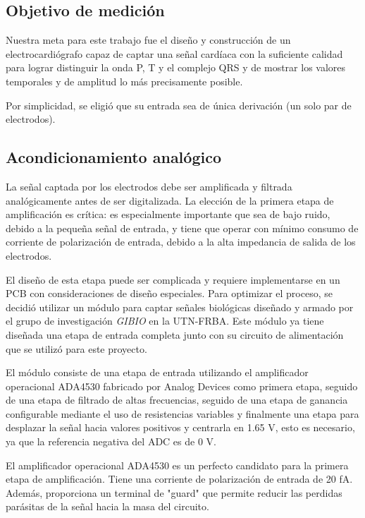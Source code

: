 \documentclass[conference]{IEEEtran}
\begin{document}
\subsection{Objetivo de medición}

Nuestra meta para este trabajo fue el diseño y construcción de un
electrocardiógrafo capaz de captar una señal cardíaca con la suficiente calidad
para lograr distinguir la onda P, T y el complejo QRS y de mostrar los valores
temporales y de amplitud lo más precisamente posible.

Por simplicidad, se eligió que su entrada sea de única derivación (un solo par
de electrodos).

\subsection{Acondicionamiento analógico}


La señal captada por los electrodos debe ser amplificada y filtrada
analógicamente antes de ser digitalizada. La elección de la primera etapa de
amplificación es crítica: es especialmente importante que sea de bajo ruido,
debido a la pequeña señal de entrada, y tiene que operar con mínimo consumo de
corriente de polarización de entrada, debido a la alta impedancia de salida de
los electrodos.

El diseño de esta etapa puede ser complicada y requiere implementarse en un PCB 
con consideraciones de diseño especiales. Para optimizar el proceso, se decidió
utilizar un módulo para captar señales biológicas diseñado y armado por el grupo
de investigación \textit{GIBIO} en la UTN-FRBA. Este módulo ya tiene diseñada
una etapa de entrada completa junto con su circuito de alimentación que se
utilizó para este proyecto.

El módulo consiste de una etapa de entrada utilizando el amplificador
operacional ADA4530 fabricado por Analog Devices \cite{ada4530} como primera
etapa, seguido de una etapa de filtrado de altas frecuencias, seguido de una
etapa de ganancia configurable mediante el uso de resistencias variables y
finalmente una etapa para desplazar la señal hacia valores positivos y centrarla
en 1.65 V, esto es necesario, ya que la referencia negativa del ADC es de 0 V.

El amplificador operacional ADA4530 es un perfecto candidato para la primera
etapa de amplificación. Tiene una corriente de polarización de entrada de 20 fA.
Además, proporciona un terminal de "guard" que permite reducir las perdidas
parásitas de la señal hacia la masa del circuito.
 
\end{document}
